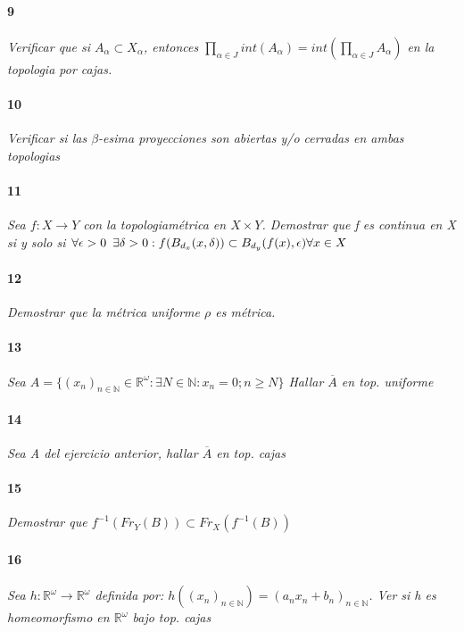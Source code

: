 \documentclass[12pt]{article}
\begin{document}
\paragraph{9}
\textit{Verificar que si $A_{\alpha}\subset X_{\alpha}$, entonces $\prod\limits_{\alpha\in J } int(A_{\alpha}) = int(\prod\limits_{\alpha\in J }A_{\alpha})$ en la topologia por cajas.}

\paragraph{10}
\textit{Verificar si las $\beta$-esima proyecciones son abiertas y/o cerradas en ambas topologias}

\paragraph{11}
\textit{Sea $f:X\rightarrow Y$ con la topologiamétrica en $X\times Y$. Demostrar que f es continua en X si y solo si $\forall\epsilon>0\hspace{5px}\exists\delta>0 : f(B_{d_x}(x,\delta))\subset B_{d_y}(f(x),\epsilon) \forall x\in X$}

\paragraph{12}
\textit{Demostrar que la métrica uniforme $\rho$ es métrica.}

\paragraph{13}
\textit{Sea $A=\{(x_n)_{n\in\mathbb{N}}\in\mathbb{R}^\omega : \exists N\in\mathbb{N}: x_n =0 ; n \geq N \}$
Hallar $\overline{A}$ en top. uniforme}

\paragraph{14}
\textit{Sea A del ejercicio anterior, hallar $\overline{A}$ en top. cajas}

\paragraph{15}
\textit{Demostrar que $f^{-1}(Fr_Y(B))\subset Fr_X(f^{-1}(B))$}

\paragraph{16}
\textit{Sea $h:\mathbb{R}^\omega\rightarrow\mathbb{R}^\omega$ definida por: $h((x_n)_{n\in\mathbb{N}})=(a_n x_n +b_n)_{n\in\mathbb{N}}$. Ver si h es homeomorfismo en $\mathbb{R}^\omega$ bajo top. cajas}
\end{document}
